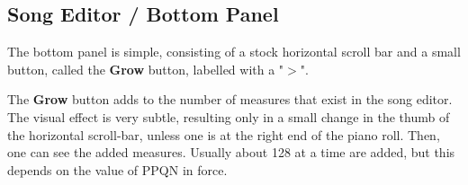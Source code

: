 \subsection{Song Editor / Bottom Panel}
\label{subsec:seq66_song_editor_bottom}

   The bottom panel is simple, consisting of a stock horizontal scroll bar
   and a small button, called the \textbf{Grow} button, labelled with a
   "\textbf{$>$}".

   The \textbf{Grow} button adds to the number of measures that exist
   in the song editor. The visual effect is very subtle, resulting only
   in a small change in the thumb of the horizontal scroll-bar, unless one
   is at the right end of the piano roll.  Then, one can see the added
   measures.  Usually about 128 at a time are added, but this depends on the
   value of PPQN in force.

